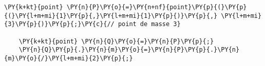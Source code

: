 \begin{Verbatim}[commandchars=\\\{\}]
    \PY{k+kt}{point} \PY{n}{P}\PY{o}{=}\PY{n+nf}{point}\PY{p}{(}\PY{p}{(}\PY{l+m+mi}{1}\PY{p}{,}\PY{l+m+mi}{1}\PY{p}{)}\PY{p}{,} \PY{l+m+mi}{3}\PY{p}{)}\PY{p}{;}\PY{c}{// point de masse 3}

    \PY{k+kt}{point} \PY{n}{Q}\PY{o}{=}\PY{n}{P}\PY{p}{;}
    \PY{n}{Q}\PY{p}{.}\PY{n}{m}\PY{o}{=}\PY{n}{P}\PY{p}{.}\PY{n}{m}\PY{o}{/}\PY{l+m+mi}{2}\PY{p}{;}
\end{Verbatim}
